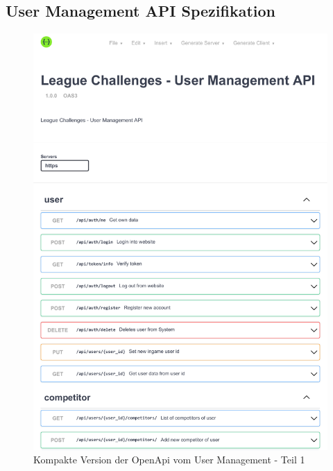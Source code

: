 \subsection{User Management API Spezifikation}
\begin{figure}
  \centering
  \includegraphics[width=1\textwidth, page=1]{images/pdfs/openapi-short.pdf}
  \caption{Kompakte Version der OpenApi vom User Management - Teil 1}
  \label{fig:compact_user_openapi_1}
\end{figure}
